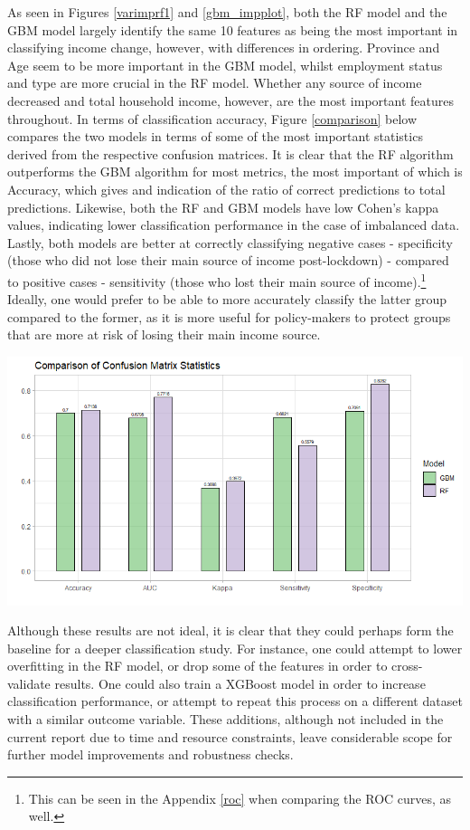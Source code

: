 \documentclass[11pt,preprint, authoryear]{elsarticle}
\let\origfigure\figure
\let\endorigfigure\endfigure
\renewenvironment{figure}[1][2] {
    \expandafter\origfigure\expandafter[H]
} {
    \endorigfigure
}
\numberwithin{equation}{section}
\numberwithin{figure}{section}
\numberwithin{table}{section}
\let\rmarkdownfootnote\footnote%
\def\footnote{\protect\rmarkdownfootnote}
\begin{document}
As seen in Figures \ref{varimprf1} and \ref{gbm_impplot}, both the RF
model and the GBM model largely identify the same 10 features as being
the most important in classifying income change, however, with
differences in ordering. Province and Age seem to be more important in
the GBM model, whilst employment status and type are more crucial in the
RF model. Whether any source of income decreased and total household
income, however, are the most important features throughout. In terms of
classification accuracy, Figure \ref{comparison} below compares the two
models in terms of some of the most important statistics derived from
the respective confusion matrices. It is clear that the RF algorithm
outperforms the GBM algorithm for most metrics, the most important of
which is Accuracy, which gives and indication of the ratio of correct
predictions to total predictions. Likewise, both the RF and GBM models
have low Cohen's kappa values, indicating lower classification
performance in the case of imbalanced data. Lastly, both models are
better at correctly classifying negative cases - specificity (those who
did not lose their main source of income post-lockdown) - compared to
positive cases - sensitivity (those who lost their main source of
income).\footnote{This can be seen in the Appendix \ref{roc} when
  comparing the ROC curves, as well.} Ideally, one would prefer to be
able to more accurately classify the latter group compared to the
former, as it is more useful for policy-makers to protect groups that
are more at risk of losing their main income source.

\begin{figure}[H]
\includegraphics[width=1\linewidth]{Figures/comparison_plot} \caption{\label{comparison} Comparison}\label{fig:comparison}
\end{figure}

Although these results are not ideal, it is clear that they could
perhaps form the baseline for a deeper classification study. For
instance, one could attempt to lower overfitting in the RF model, or
drop some of the features in order to cross-validate results. One could
also train a XGBoost model in order to increase classification
performance, or attempt to repeat this process on a different dataset
with a similar outcome variable. These additions, although not included
in the current report due to time and resource constraints, leave
considerable scope for further model improvements and robustness checks.
\end{document}
